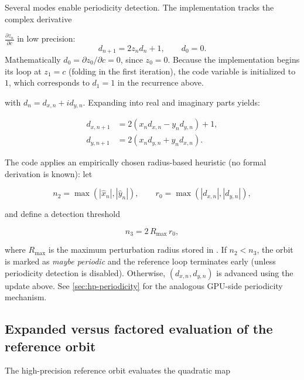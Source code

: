 Several modes enable periodicity detection. The implementation tracks the complex derivative

\(\frac{\partial z_n}{\partial c}\) in low precision:
\begin{equation}
  d_{n+1} = 2 z_n d_n + 1,\qquad d_0 = 0.
  \label{eq:dzdc-def}
\end{equation}
Mathematically \(d_0 = \partial z_0/\partial c = 0\), since \(z_0=0\).
Because the implementation begins its loop at \(z_1=c\) (folding in the
first iteration), the code variable  is initialized to~$1$,
which corresponds to \(d_1=1\) in the recurrence above.

with \(d_n = d_{x,n} + i d_{y,n}\). Expanding into real and imaginary parts yields:

\begin{align}
  d_{x,n+1} &= 2(x_n d_{x,n} - y_n d_{y,n}) + 1, \label{eq:st-dzdc-real} \\
  d_{y,n+1} &= 2(x_n d_{y,n} + y_n d_{x,n}). \label{eq:st-dzdc-imag}
\end{align}

The code applies an empirically chosen radius-based heuristic (no formal derivation is known): let

\begin{equation}
  n_2 = \max(|\hat{x}_n|,|\hat{y}_n|),\qquad
  r_0 = \max(|d_{x,n}|,|d_{y,n}|),
  \label{eq:periodicity-norms}
\end{equation}

and define a detection threshold

\begin{equation}
  n_3 = 2\,R_{\max}\,r_0,
  \label{eq:periodicity-threshold}
\end{equation}

where \(R_{\max}\) is the maximum perturbation radius stored in 
. If \(n_2 < n_3\), the orbit is marked as \emph{maybe periodic} and the
reference loop terminates early (unless periodicity detection is disabled).
Otherwise, \((d_{x,n},d_{y,n})\) is advanced using the update above.
See \cref{sec:hp-periodicity} for the analogous GPU-side periodicity mechanism.

\subsection{Expanded versus factored evaluation of the reference orbit}

The high-precision reference orbit evaluates the quadratic map

